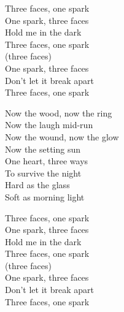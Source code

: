 \begin{lyrics}
Three faces, one spark\\
One spark, three faces\\
Hold me in the dark\\
Three faces, one spark\\
(three faces)\\
One spark, three faces\\
Don’t let it break apart\\
Three faces, one spark

Now the wood, now the ring\\
Now the laugh mid-run\\
Now the wound, now the glow\\
Now the setting sun\\
One heart, three ways\\
To survive the night\\
Hard as the glass\\
Soft as morning light

Three faces, one spark\\
One spark, three faces\\
Hold me in the dark\\
Three faces, one spark\\
(three faces)\\
One spark, three faces\\
Don’t let it break apart\\
Three faces, one spark

\end{lyrics}


